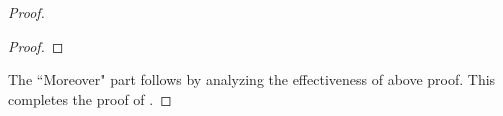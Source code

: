 \documentclass{article}
\def\mcal{\mathcal}
\def\h{\hat}
\def\uhr{\upharpoonright}
\def\wsamelong{\mathsf{WSub}^{=}}
\def\wshorter{\mathsf{WSub}^{*}}
\def\vwsamelong{\mathsf{OSub}^=}
\def\sufficient{matching}
\def\GRtree{Graham-Rothschild tree}
\numberwithin{theorem}{section}
\theoremstyle{definition}
\begin{document}
\begin{proof}
\begin{proof}




\end{proof}
The ``Moreover" part follows by analyzing  the effectiveness of above proof.
This completes the proof of .
\end{proof}
\end{document}
